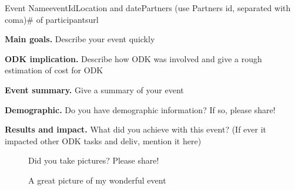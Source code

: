 \begin{event}{Event Name}{eventId}{Location and date}{Partners (use Partners id, separated with coma)}{# of participants}{url}

\textbf{Main goals.} Describe your event quickly

\textbf{ODK implication.} Describe how ODK was involved and give a rough estimation of cost for ODK

\textbf{Event summary.} Give a summary of your event

\textbf{Demographic.} Do you have demographic information? If so, please share!

\textbf{Results and impact.} What did you achieve with this event? (If ever it impacted 
other ODK tasks and deliv, mention it here)

\begin{figure}[ht]
\caption*{A great picture of my wonderful event}
Did you take pictures? Please share!
\end{figure}



\end{event}